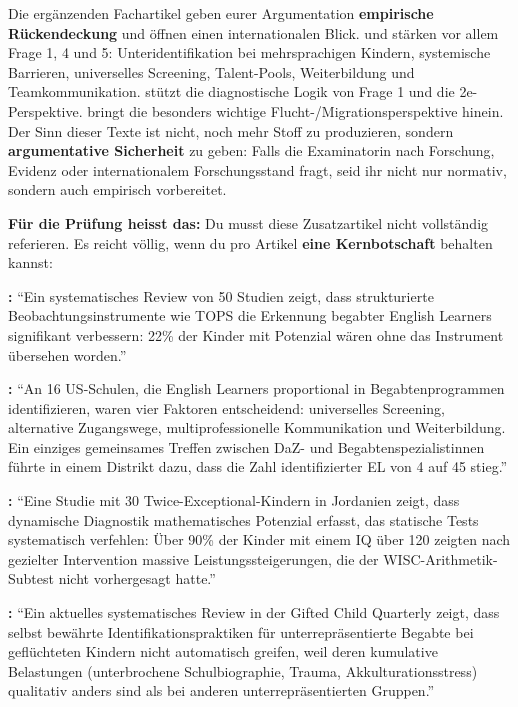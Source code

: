 \documentclass[ngerman, a4paper]{article}
\begin{document}
\begin{kapitelueberblick}
Die ergänzenden Fachartikel geben eurer Argumentation \textbf{empirische Rückendeckung} und öffnen einen internationalen Blick. \textcite{mun2020identifying} und \textcite{gubbins2020promising} stärken vor allem Frage 1, 4 und 5: Unteridentifikation bei mehrsprachigen Kindern, systemische Barrieren, universelles Screening, Talent-Pools, Weiterbildung und Teamkommunikation. \textcite{alhroub2021utility} stützt die diagnostische Logik von Frage 1 und die 2e-Perspektive. \textcite{alodat2025equitable} bringt die besonders wichtige Flucht-/Migrationsperspektive hinein. Der Sinn dieser Texte ist nicht, noch mehr Stoff zu produzieren, sondern \textbf{argumentative Sicherheit} zu geben: Falls die Examinatorin nach Forschung, Evidenz oder internationalem Forschungsstand fragt, seid ihr nicht nur normativ, sondern auch empirisch vorbereitet.

\medskip\textbf{Für die Prüfung heisst das:} Du musst diese Zusatzartikel nicht vollständig referieren. Es reicht völlig, wenn du pro Artikel \textbf{eine Kernbotschaft} behalten kannst:

\medskip\textbf{\textcite{mun2020identifying}:} \enquote{Ein systematisches Review von 50 Studien zeigt, dass
strukturierte Beobachtungsinstrumente wie TOPS die Erkennung begabter English Learners
signifikant verbessern: 22\% der Kinder mit Potenzial wären ohne das Instrument übersehen
worden.}

\medskip\textbf{\textcite{gubbins2020promising}:} \enquote{An 16 US-Schulen, die English Learners proportional
in Begabtenprogrammen identifizieren, waren vier Faktoren entscheidend: universelles
Screening, alternative Zugangswege, multiprofessionelle Kommunikation und Weiterbildung.
Ein einziges gemeinsames Treffen zwischen DaZ- und Begabtenspezialistinnen führte in
einem Distrikt dazu, dass die Zahl identifizierter EL von 4 auf 45 stieg.}

\medskip\textbf{\textcite{alhroub2021utility}:} \enquote{Eine Studie mit 30 Twice-Exceptional-Kindern in Jordanien
zeigt, dass dynamische Diagnostik mathematisches Potenzial erfasst, das statische Tests
systematisch verfehlen: Über 90\% der Kinder mit einem IQ über 120 zeigten nach gezielter
Intervention massive Leistungssteigerungen, die der WISC-Arithmetik-Subtest nicht
vorhergesagt hatte.}

\medskip\textbf{\textcite{alodat2025equitable}:} \enquote{Ein aktuelles systematisches Review in der \textup{Gifted Child
Quarterly} zeigt, dass selbst bewährte Identifikationspraktiken für unterrepräsentierte
Begabte bei geflüchteten Kindern nicht automatisch greifen, weil deren kumulative
Belastungen (unterbrochene Schulbiographie, Trauma, Akkulturationsstress) qualitativ anders
sind als bei anderen unterrepräsentierten Gruppen.}
\end{kapitelueberblick}
\end{document}
